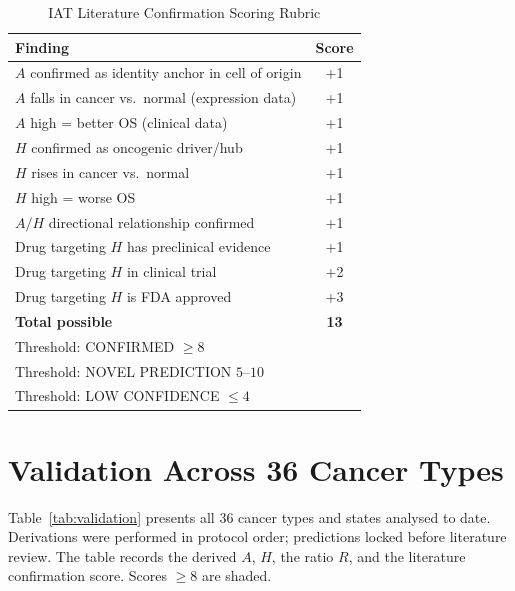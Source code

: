 \documentclass[11pt, a4paper]{article}
\begin{document}
\begin{table}[H]
\caption{IAT Literature Confirmation Scoring Rubric}
\label{tab:scoring}
\centering
\begin{tabular}{p{8.5cm}c}
\toprule
\textbf{Finding} & \textbf{Score} \\
\midrule
$A$ confirmed as identity anchor in cell of origin & +1 \\
$A$ falls in cancer vs.\ normal (expression data) & +1 \\
$A$ high = better OS (clinical data) & +1 \\
$H$ confirmed as oncogenic driver/hub & +1 \\
$H$ rises in cancer vs.\ normal & +1 \\
$H$ high = worse OS & +1 \\
$A/H$ directional relationship confirmed & +1 \\
Drug targeting $H$ has preclinical evidence & +1 \\
Drug targeting $H$ in clinical trial & +2 \\
Drug targeting $H$ is FDA approved & +3 \\
\midrule
\textbf{Total possible} & \textbf{13} \\
\midrule
Threshold: CONFIRMED $\geq 8$ &  \\
Threshold: NOVEL PREDICTION $5$--$10$ &  \\
Threshold: LOW CONFIDENCE $\leq 4$ &  \\
\bottomrule
\end{tabular}
\end{table}

\section{Validation Across 36 Cancer Types}
\label{sec:validation}

Table~\ref{tab:validation} presents all 36 cancer
types and states analysed to date. Derivations were
performed in protocol order; predictions locked before
literature review. The table records the derived $A$,
$H$, the ratio $R$, and the literature confirmation
score. Scores $\geq 8$ are shaded.
\end{document}
